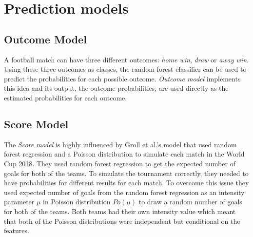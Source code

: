 \section{Prediction models}
\subsection{Outcome Model}
A football match can have three different outcomes: \textit{home win}, \textit{draw} or \textit{away win}. Using these three outcomes as classes, the random forest classifier can be used to predict the probabilities for each possible outcome. \textit{Outcome model} implements this idea and its output, the outcome probabilities, are used directly as the estimated probabilities for each outcome.
\subsection{Score Model}
The \textit{Score model} is highly influenced by Groll et al.'s \cite{groll2018prediction} model that used random forest regression and a Poisson distribution to simulate each match in the World Cup 2018. They used random forest regression to get the expected number of goals for both of the teams. To simulate the tournament correctly, they needed to have probabilities for different results for each match. To overcome this issue they used expected number of goals from the random forest regression as an intensity parameter $\mu$ in Poisson distribution $Po(\mu)$ to draw a random number of goals for both of the teams. Both teams had their own intensity value which meant that both of the Poisson distributions were independent but conditional on the features.

